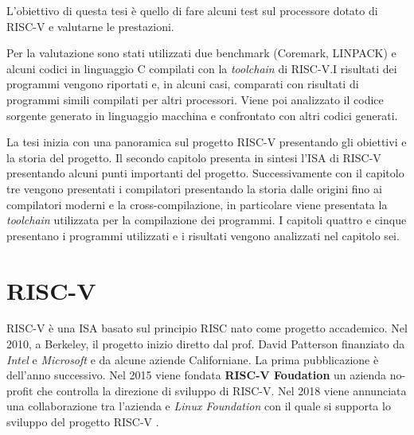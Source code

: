 \documentclass[12pt, a4paper]{report}
\begin{document}
L'obiettivo di questa tesi è quello di fare alcuni test sul processore dotato di RISC-V e valutarne le prestazioni.

Per la valutazione sono stati utilizzati due benchmark (Coremark, LINPACK) e alcuni
codici in linguaggio C compilati con la \textit{toolchain} di RISC-V.I risultati dei programmi vengono riportati e, in alcuni casi, comparati con risultati di programmi simili compilati per altri processori. Viene poi analizzato il codice sorgente generato in linguaggio macchina e confrontato con altri codici generati.

La tesi inizia con una panoramica sul progetto RISC-V presentando gli obiettivi e la storia del progetto. Il secondo capitolo presenta in sintesi l'ISA di RISC-V presentando alcuni punti importanti del progetto. Successivamente con il capitolo tre vengono presentati i compilatori presentando la storia dalle origini fino ai compilatori moderni e la cross-compilazione, in particolare viene presentata la \textit{toolchain} utilizzata per la compilazione dei programmi.
I capitoli quattro e cinque presentano i programmi utilizzati e i risultati vengono analizzati nel capitolo sei.


\chapter{RISC-V}
RISC-V è una ISA basato sul principio RISC nato come progetto accademico. Nel 2010, a Berkeley, il progetto inizio diretto dal prof. David Patterson finanziato da \textit{Intel } e \textit{Microsoft} e da alcune aziende Californiane. La prima pubblicazione è dell'anno successivo. Nel 2015 viene fondata \textbf{RISC-V Foudation} un azienda no-profit che controlla la direzione di sviluppo di RISC-V. Nel 2018 viene annunciata una collaborazione tra l'azienda e \textit{Linux Foundation} con il quale si supporta lo sviluppo del progetto RISC-V \cite{RISCOrgHistory}.
\end{document}
